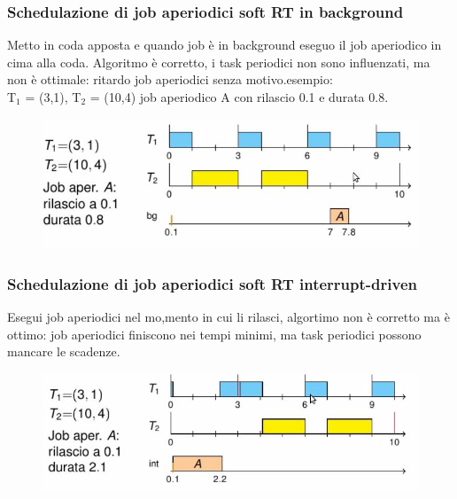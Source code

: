 \documentclass[12pt, oneside]{extbook}
\begin{document}
\subsubsection{Schedulazione di job aperiodici soft RT in background}
Metto in coda apposta e quando job è in background eseguo il job aperiodico in cima alla coda. Algoritmo è corretto, i task periodici non sono influenzati, ma non è ottimale: ritardo job aperiodici senza motivo.esempio:\\
T$_{1}$ = (3,1), T$_{2}$ = (10,4) job aperiodico A con rilascio 0.1 e durata 0.8.\\
\begin{figure}[!h]
\centering
\includegraphics[scale=0.4]{immagini/image-009.jpg}
\end{figure}
\subsubsection{Schedulazione di job aperiodici soft RT interrupt-driven}
Esegui job aperiodici nel mo,mento in cui li rilasci, algortimo non è corretto ma è ottimo: job aperiodici finiscono nei tempi minimi, ma task periodici possono mancare le scadenze.\\
\begin{figure}[!h]
\centering
\includegraphics[scale=0.4]{immagini/image-010.jpg}
\end{figure}
\end{document}
